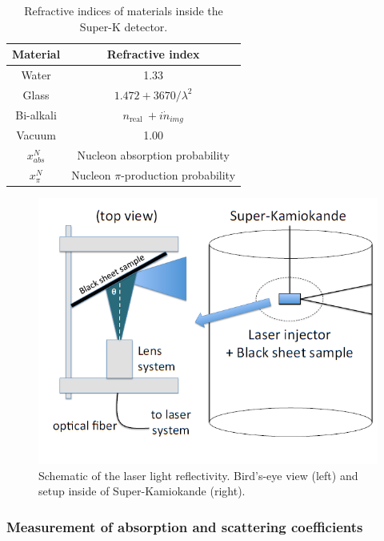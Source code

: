 \begin{table}
\centering
\begin{tabular}{||cc||}
    \hline Material & Refractive index \\
    \hline Water & 1.33 \\
    \hline Glass & $1.472+3670 / \lambda^2$ \\
    \hline Bi-alkali & $n_{\text {real }}+i \dot{n}_{i m g}$ \\
    \hline Vacuum & 1.00 \\
    \hline$x_{a b s}^N$ & Nucleon absorption probability \\
    \hline$x_\pi^N$ & Nucleon $\pi$-production probability \\
    \hline
    \end{tabular}
    \caption{Refractive indices of materials inside the Super-K detector.} 
    \label{table:refractiveindex}
\end{table}
    

\begin{figure}
    \includegraphics[width=\textwidth]{Figures/blacksheetrefsetup.png}
\caption{Schematic of the laser light reflectivity. Bird's-eye view (left) and setup inside of Super-Kamiokande (right).}
    \label{fig:blacksheetrefsetup}
\end{figure}


\subsubsection{Measurement of absorption and scattering coefficients}

